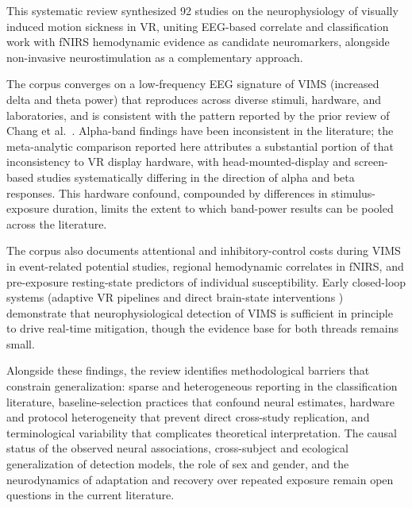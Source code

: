 This systematic review synthesized 92 studies on the neurophysiology of visually induced motion sickness in VR, uniting EEG-based correlate and classification work with fNIRS hemodynamic evidence as candidate neuromarkers, alongside non-invasive neurostimulation as a complementary approach.

The corpus converges on a low-frequency EEG signature of VIMS (increased delta and theta power) that reproduces across diverse stimuli, hardware, and laboratories, and is consistent with the pattern reported by the prior review of Chang et al.~\cite{changBrainActivityCybersickness2023}.
Alpha-band findings have been inconsistent in the literature; the meta-analytic comparison reported here attributes a substantial portion of that inconsistency to VR display hardware, with head-mounted-display and screen-based studies systematically differing in the direction of alpha and beta responses.
This hardware confound, compounded by differences in stimulus-exposure duration, limits the extent to which band-power results can be pooled across the literature.

The corpus also documents attentional and inhibitory-control costs during VIMS in event-related potential studies, regional hemodynamic correlates in fNIRS, and pre-exposure resting-state predictors of individual susceptibility.
Early closed-loop systems (adaptive VR pipelines \cite{uyanCDMSRealtimeSystem2024, yamamuraHemodynamicVRAdaptingUsers2021} and direct brain-state interventions \cite{liReducedVRMotion2024, benelliFrequencyDependentReductionCybersickness2023}) demonstrate that neurophysiological detection of VIMS is sufficient in principle to drive real-time mitigation, though the evidence base for both threads remains small.

Alongside these findings, the review identifies methodological barriers that constrain generalization: sparse and heterogeneous reporting in the classification literature, baseline-selection practices that confound neural estimates, hardware and protocol heterogeneity that prevent direct cross-study replication, and terminological variability that complicates theoretical interpretation.
The causal status of the observed neural associations, cross-subject and ecological generalization of detection models, the role of sex and gender, and the neurodynamics of adaptation and recovery over repeated exposure remain open questions in the current literature.
